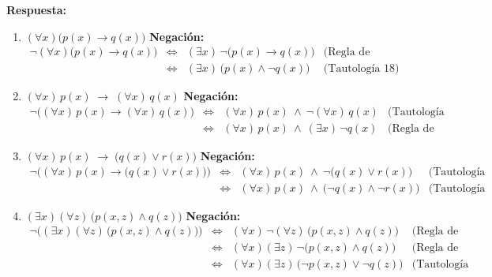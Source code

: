 \documentclass[12pt,letterpaper]{exam}
\begin{document}
\begin{enumerate}
    \textbf{Respuesta:}

\begin{enumerate}[label=\alph*)]

\item $(\forall x)\big(p(x)\to q(x)\big)$ \; \textbf{Negación:}
\[
\begin{array}{rcll}
\neg(\forall x)\big(p(x)\to q(x)\big)
&\iff& (\exists x)\,\neg\big(p(x)\to q(x)\big) & \text{(Regla de cuantif.\ 1)}\\[2pt]
&\iff& (\exists x)\,\big(p(x)\land \neg q(x)\big) & \text{(Tautología 18)}
\end{array}
\]

\item $(\forall x)\,p(x)\;\to\;(\forall x)\,q(x)$ \; \textbf{Negación:}
\[
\begin{array}{rcll}
\neg\Big((\forall x)\,p(x)\to(\forall x)\,q(x)\Big)
&\iff& (\forall x)\,p(x)\ \land\ \neg(\forall x)\,q(x) & \text{(Tautología 18)}\\[2pt]
&\iff& (\forall x)\,p(x)\ \land\ (\exists x)\,\neg q(x) & \text{(Regla de cuantif.\ 1)}
\end{array}
\]

\item $(\forall x)\,p(x)\;\to\;\big(q(x)\vee r(x)\big)$ \; \textbf{Negación:}
\[
\begin{array}{rcll}
\neg\Big((\forall x)\,p(x)\to\big(q(x)\vee r(x)\big)\Big)
&\iff& (\forall x)\,p(x)\ \land\ \neg\big(q(x)\vee r(x)\big) & \text{(Tautología 18)}\\[2pt]
&\iff& (\forall x)\,p(x)\ \land\ \big(\neg q(x)\land \neg r(x)\big) & \text{(Tautología 17)}
\end{array}
\]

\item $(\exists x)(\forall z)\,\big(p(x,z)\wedge q(z)\big)$ \; \textbf{Negación:}
\[
\begin{array}{rcll}
\neg\Big((\exists x)(\forall z)\,\big(p(x,z)\wedge q(z)\big)\Big)
&\iff& (\forall x)\,\neg(\forall z)\,\big(p(x,z)\wedge q(z)\big) & \text{(Regla de cuantif.\ 2)}\\[2pt]
&\iff& (\forall x)(\exists z)\,\neg\big(p(x,z)\wedge q(z)\big) & \text{(Regla de cuantif.\ 1)}\\[2pt]
&\iff& (\forall x)(\exists z)\,\big(\neg p(x,z)\vee \neg q(z)\big) & \text{(Tautología 5)}
\end{array}
\]

\end{enumerate}



\end{enumerate}
\end{document}
